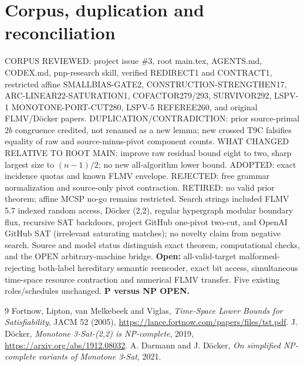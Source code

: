 \documentclass[10pt]{article}
\begin{document}
\section{Corpus, duplication and reconciliation}
CORPUS REVIEWED: project issue \#3, root main.tex, AGENTS.md, CODEX.md, pnp-research skill, verified REDIRECT1 and CONTRACT1, restricted affine SMALLBIAS-GATE2, CONSTRUCTION-STRENGTHEN17, ARC-LINEAR22-SATURATION1, COFACTOR279/293, SURVIVOR292, LSPV-1 MONOTONE-PORT-CUT280, LSPV-5 REFEREE260, and original FLMV/D\"ocker papers.
DUPLICATION/CONTRADICTION: prior source-primal $2b$ congruence credited, not renamed as a new lemma; new crossed T9C falsifies equality of raw and source-minus-pivot component counts. WHAT CHANGED RELATIVE TO ROOT MAIN: improve raw residual bound eight to two, sharp largest size to $(n-1)/2$; no new all-algorithm lower bound. ADOPTED: exact incidence quotas and known FLMV envelope. REJECTED: free grammar normalization and source-only pivot contraction. RETIRED: no valid prior theorem; affine MCSP no-go remains restricted.
Search strings included FLMV 5.7 indexed random access, D\"ocker (2,2), regular hypergraph modular boundary flux, recursive SAT backdoors, project GitHub one-pivot two-cut, and OpenAI GitHub SAT (irrelevant saturating matches); no novelty claim from negative search. Source and model status distinguish exact theorem, computational checks, and the OPEN arbitrary-machine bridge.
\noindent\textbf{Open:} all-valid-target malformed-rejecting both-label hereditary semantic reencoder, exact bit access, simultaneous time-space resource contraction and numerical FLMV transfer. Five existing roles/schedules unchanged. \textbf{P versus NP OPEN.}
\begin{thebibliography}{9}
 Fortnow, Lipton, van Melkebeek and Viglas, \emph{Time-Space Lower Bounds for Satisfiability}, JACM 52 (2005), \url{https://lance.fortnow.com/papers/files/tst.pdf}.
 J. D\"ocker, \emph{Monotone 3-Sat-(2,2) is NP-complete}, 2019, \url{https://arxiv.org/abs/1912.08032}.
 A. Darmann and J. D\"ocker, \emph{On simplified NP-complete variants of Monotone 3-Sat}, 2021.
\end{thebibliography}
\end{document}
